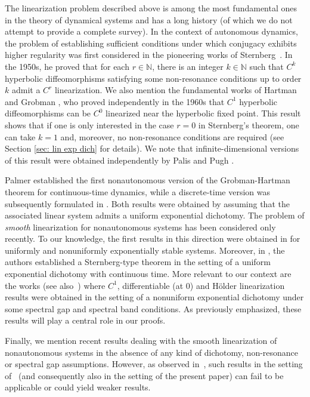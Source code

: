 \documentclass[reqno, a4paper, 10pt]{amsart}
\theoremstyle{plain}
\numberwithin{equation}{section}
\theoremstyle{remark}
\begin{document}
The linearization problem described above is among the most fundamental ones in the theory of dynamical systems and has a long history (of which we do not attempt to provide a complete survey). In the context of autonomous dynamics, the problem of establishing sufficient conditions under which conjugacy exhibits higher regularity was first considered in the pioneering works of Sternberg~\cite{Sternberg2, Sternberg58}. In the 1950s, he proved that for each $r\in \mathbb{N}$, there is an integer $k\in \mathbb{N}$ such that $C^k$ hyperbolic diffeomorphisms satisfying some non-resonance conditions up to order $k$ admit a $C^r$ linearization.
We also mention the fundamental works of Hartman \cite{HartPAMS60} and Grobman \cite{Grobman}, who proved independently in the 1960s that $C^1$ hyperbolic diffeomorphisms can be $C^0$ linearized near the hyperbolic ﬁxed point. 
This result shows that if one is only interested in the case $r=0$ in Sternberg's theorem, one can take $k=1$ and, moreover, no non-resonance conditions are required (see Section \ref{sec: lin exp dich} for details). We note that infinite-dimensional versions of this result were obtained independently by Palis \cite{Palis} and Pugh \cite{Pugh}.


Palmer \cite{Palmer} established the first nonautonomous version of the Grobman-Hartman theorem for continuous-time dynamics, while a discrete-time version was subsequently formulated in \cite{AW}. Both results were obtained by assuming that the associated linear system admits a uniform exponential dichotomy.
The problem of \emph{smooth} linearization for nonautonomous systems has been considered only recently. To our knowledge, the first results in this direction were obtained in \cite{CMR,CR} for uniformly and nonuniformly exponentially stable systems. Moreover, in \cite{CDS}, the authors established a Sternberg-type theorem in the setting of a uniform exponential dichotomy with continuous time.
More relevant to our context are the works \cite{DZZ,DZZ20} (see also~\cite{D1}) where $C^1$, differentiable (at 0) and H\"older linearization results were obtained in the setting of a nonuniform exponential dichotomy under some spectral gap and spectral band conditions. As previously emphasized, these results will play a central role in our proofs.

Finally, we mention  recent results \cite{BD, CHR, CJ, J} dealing with the smooth linearization of nonautonomous systems in the absence of  any kind of dichotomy, non-resonance or spectral gap assumptions. However, as observed in~\cite{BD},  such results in the setting of~\cite{DZZ} (and consequently also in the setting of the present paper)  can fail to be applicable or could yield weaker results.
\end{document}
